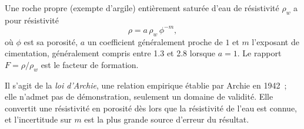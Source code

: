 \begin{proposition}\label{prop:b3:field-lab-methods-3:archie}
Une roche propre (exempte d'argile) entièrement saturée d'eau de
résistivité $\rho_w$ a pour résistivité
\[
\rho = a\,\rho_w\,\phi^{-m} ,
\]
où $\phi$ est sa porosité, $a$ un coefficient généralement proche de $1$
et $m$ l'exposant de cimentation, généralement compris entre \num{1.3} et
\num{2.8} lorsque $a = 1$. Le rapport $F = \rho/\rho_w$ est le facteur de
formation.
\end{proposition}
Il s'agit de la \emph{loi d'Archie}, une relation empirique
établie par Archie en 1942~; elle n'admet pas de démonstration, seulement un domaine de validité. Elle convertit une résistivité en porosité
dès lors que la résistivité de l'eau est connue, et l'incertitude sur $m$ est la plus grande source d'erreur du résultat.

